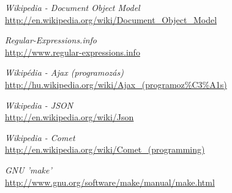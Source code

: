\documentclass[12pt,a4paper,twoside]{article}
\begin{document}
\begin{thebibliography}{99}
  \emph{Wikipedia - Document Object Model}\\
  \url{http://en.wikipedia.org/wiki/Document_Object_Model}

  \emph{Regular-Expressions.info}\\
  \url{http://www.regular-expressions.info}

  \emph{Wikipédia - Ajax (programozás)}\\
  \url{http://hu.wikipedia.org/wiki/Ajax_(programoz\%C3\%A1s)}

  \emph{Wikipedia - JSON}\\
  \url{http://en.wikipedia.org/wiki/Json}

  \emph{Wikipedia - Comet}\\
  \url{http://en.wikipedia.org/wiki/Comet_(programming)}

  \emph{GNU 'make'}\\
  \url{http://www.gnu.org/software/make/manual/make.html}

\end{thebibliography}
\end{document}
